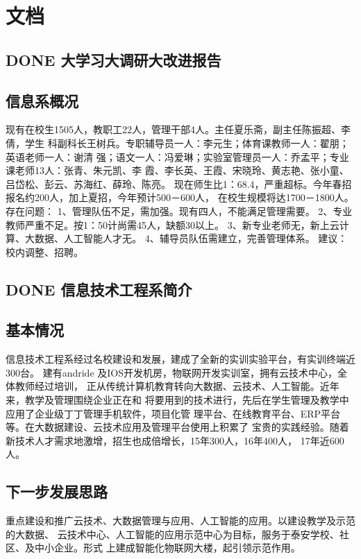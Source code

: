 \documentclass[11pt]{ctexart}
\begin{document}
{{{{\section{文档}
\label{sec:org580cf77}
\subsection{{\bfseries\sffamily DONE} 大学习大调研大改进报告}
\label{sec:org7717b2a}
\subsection{信息系概况}
\label{sec:orgbc649e7}
现有在校生1505人，教职工22人，管理干部4人。主任夏乐斋，副主任陈振超、李倩，学生
科副科长王树兵。专职辅导员一人：李元生；体育课教师一人：翟朋；英语老师一人：谢清
强；语文一人：冯爱琳；实验室管理员一人：乔孟平；专业课老师13人：张青、朱元凯、李
霞、李长英、王霞、宋晓玲、黄志艳、张小童、吕岱松、彭云、苏海红、薛玲、陈亮。
现在师生比1：68.4，严重超标。今年春招报名约200人，加上夏招，今年预计500－600人，
在校生规模将达1700－1800人。
存在问题：
1、管理队伍不足，需加强。现有四人，不能满足管理需要。
2、专业教师严重不足。按1：50计尚需45人，缺额30以上。
3、新专业老师无，新上云计算、大数据、人工智能人才无。
4、辅导员队伍需建立，完善管理体系。
建议：校内调整、招聘。
\subsection{{\bfseries\sffamily DONE} 信息技术工程系简介}
\label{sec:org53107cc}
\subsection{基本情况}
\label{sec:orgab3e65b}
信息技术工程系经过名校建设和发展，建成了全新的实训实验平台，有实训终端近300台。
建有andride 及IOS开发机房，物联网开发实训室，拥有云技术中心，全体教师经过培训，
正从传统计算机教育转向大数据、云技术、人工智能。近年来，教学及管理围绕企业正在和
将要用到的技术进行，先后在学生管理及教学中应用了企业级丁丁管理手机软件，项目化管
理平台、在线教育平台、ERP平台等。在大数据建设、云技术应用及管理平台使用上积累了
宝贵的实践经验。随着新技术人才需求地激增，招生也成倍增长，15年300人，16年400人，
17年近600人。
\subsection{下一步发展思路}
\label{sec:orgaad9216}
重点建设和推广云技术、大数据管理与应用、人工智能的应用。以建设教学及示范的大数据、
云技术中心、人工智能的应用示范中心为目标，服务于泰安学校、社区、及中小企业。形式
上建成智能化物联网大楼，起引领示范作用。
}}}}
\end{document}
